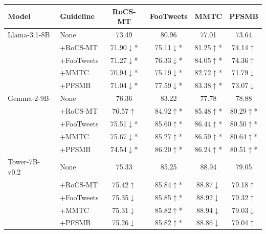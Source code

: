 \begin{tabular}{llcccc}
\toprule
Model & Guideline & RoCS-MT & FooTweets & MMTC & PFSMB \\
\midrule
Llama-3.1-8B & None & 73.49 & 80.96 & 77.01 & 73.64 \\
 & +RoCS-MT & 71.90\colorbox{myred}{$\downarrow$}* & 75.11\colorbox{myred}{$\downarrow$}* & 81.25\colorbox{mygreen}{$\uparrow$}* & 74.14\colorbox{mygreen}{$\uparrow$} \\
 & +FooTweets & 71.27\colorbox{myred}{$\downarrow$}* & 76.33\colorbox{myred}{$\downarrow$}* & 84.05\colorbox{mygreen}{$\uparrow$}* & 74.36\colorbox{mygreen}{$\uparrow$} \\
 & +MMTC & 70.94\colorbox{myred}{$\downarrow$}* & 75.19\colorbox{myred}{$\downarrow$}* & 82.72\colorbox{mygreen}{$\uparrow$}* & 71.79\colorbox{myred}{$\downarrow$} \\
 & +PFSMB & 71.04\colorbox{myred}{$\downarrow$}* & 77.59\colorbox{myred}{$\downarrow$}* & 83.38\colorbox{mygreen}{$\uparrow$}* & 73.07\colorbox{myred}{$\downarrow$} \\
Gemma-2-9B & None & 76.36 & 83.22 & 77.78 & 78.88 \\
 & +RoCS-MT & 76.57\colorbox{mygreen}{$\uparrow$} & 84.92\colorbox{mygreen}{$\uparrow$}* & 85.48\colorbox{mygreen}{$\uparrow$}* & 80.29\colorbox{mygreen}{$\uparrow$}* \\
 & +FooTweets & 75.51\colorbox{myred}{$\downarrow$}* & 85.60\colorbox{mygreen}{$\uparrow$}* & 86.44\colorbox{mygreen}{$\uparrow$}* & 80.50\colorbox{mygreen}{$\uparrow$}* \\
 & +MMTC & 75.67\colorbox{myred}{$\downarrow$}* & 85.27\colorbox{mygreen}{$\uparrow$}* & 86.59\colorbox{mygreen}{$\uparrow$}* & 80.64\colorbox{mygreen}{$\uparrow$}* \\
 & +PFSMB & 74.54\colorbox{myred}{$\downarrow$}* & 86.20\colorbox{mygreen}{$\uparrow$}* & 86.24\colorbox{mygreen}{$\uparrow$}* & 80.51\colorbox{mygreen}{$\uparrow$}* \\
Tower-7B-v0.2 & None & 75.33 & 85.25 & 88.94 & 79.05 \\
 & +RoCS-MT & 75.42\colorbox{mygreen}{$\uparrow$} & 85.84\colorbox{mygreen}{$\uparrow$}* & 88.87\colorbox{myred}{$\downarrow$} & 79.18\colorbox{mygreen}{$\uparrow$} \\
 & +FooTweets & 75.35\colorbox{myred}{$\downarrow$} & 85.85\colorbox{mygreen}{$\uparrow$}* & 88.92\colorbox{myred}{$\downarrow$} & 79.32\colorbox{mygreen}{$\uparrow$} \\
 & +MMTC & 75.31\colorbox{myred}{$\downarrow$} & 85.82\colorbox{mygreen}{$\uparrow$}* & 88.94\colorbox{myred}{$\downarrow$} & 79.03\colorbox{myred}{$\downarrow$} \\
 & +PFSMB & 75.26\colorbox{myred}{$\downarrow$} & 85.82\colorbox{mygreen}{$\uparrow$}* & 88.86\colorbox{myred}{$\downarrow$} & 79.04\colorbox{mygreen}{$\uparrow$} \\
\bottomrule
\end{tabular}
